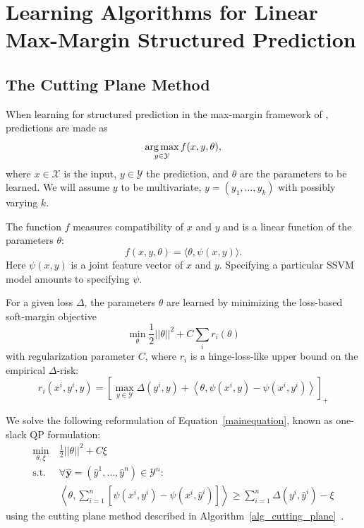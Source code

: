 \section{Learning Algorithms for Linear Max-Margin Structured Prediction}
\subsection{The Cutting Plane Method}\label{cutting_plane}

When learning for structured prediction in the max-margin framework of
\citet{tsochantaridis2006large}, predictions are made as
\[ \operatorname*{arg\,max}_{y \in \mathcal{Y}} f(x, y, \theta),\]
where $x \in \mathcal{X}$ is the input, $y \in \mathcal{Y}$ the prediction, and $\theta$ are the parameters to be learned.
We will assume $y$ to be multivariate, $y=(y_1, \dots, y_k)$ with possibly varying $k$.

The function $f$ measures compatibility of $x$ and $y$ and is a linear function of the parameters $\theta$:
\[f(x, y, \theta) = \langle \theta, \psi(x, y) \rangle.\]
Here $\psi(x, y)$ is a joint feature vector of $x$ and $y$. Specifying a particular SSVM model
amounts to specifying $\psi$.

For a given loss $\Delta$, the parameters $\theta$ are learned by minimizing
the loss-based soft-margin objective
\begin{equation}\label{eq:mainequation}
\min_\theta \frac{1}{2} ||\theta||^2 + C \sum_i  r_i(\theta)
\end{equation}
with regularization parameter $C$, where $r_i$ is a hinge-loss-like upper
bound on the empirical $\Delta$-risk:
\[r_i(x^i, y^i, y) = \left [\max_{y \in \mathcal{Y}} \Delta(y^i, y) + \left<\theta, \psi(x^i, y) - \psi(x^i, y^i) \right > \right]_+ \]

We solve the following reformulation of Equation~\eqref{mainequation}, known as one-slack QP formulation:
\begin{align}\label{eq:oneslack}
    \min_{\theta, \xi}\ &\frac{1}{2} ||\theta||^2 + C \xi\\
    \text{s.t. }&\forall \hat{\mathbf{y}}=(\hat{y}^1, \dots, \hat{y}^n) \in \mathcal{Y}^n:\\
        &\left \langle \theta, \sum_{i=1}^n [\psi(x^i, y^i) - \psi(x^i,
            \hat{y}^i)] \right \rangle \geq \sum_{i=1}^n \Delta(y^i, \hat{y}^i)
            - \xi
\end{align}
using the cutting plane method described in
Algorithm~\ref{alg_cutting_plane}~\citep{joachims2009cutting}.

